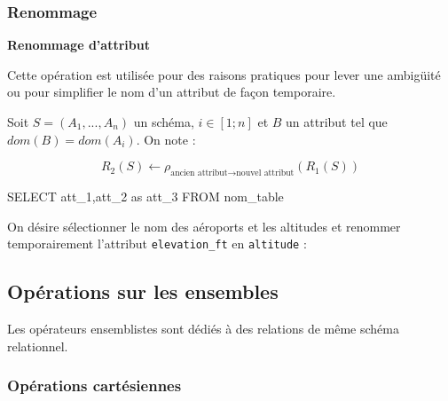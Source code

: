 \documentclass[10pt]{article}
\newif\ifprofvar
\begin{document}
\subsubsection{Renommage}
\begin{defi}
\textbf{Renommage d'attribut}

Cette opération est utilisée pour des raisons pratiques pour lever une ambigüité ou pour simplifier le nom d'un attribut de façon temporaire. 

Soit $S = (A_1,... ,A_n)$ un schéma, $ i \in[1;n]$ et $B$ un attribut tel que
$dom(B) = dom(A_i)$. On note :

$$
R_2 (S)\leftarrow \rho_{\text{ancien attribut} \rightarrow \text{nouvel attribut}}(R_1(S))
$$

\begin{envsql}
\begin{sql}
SELECT att_1,att_2 as att_3 FROM nom_table
\end{sql}
\end{envsql}

\end{defi}


\begin{exemple}
On désire sélectionner le nom des aéroports et les altitudes et  renommer temporairement l'attribut \texttt{elevation\_ft} en \texttt{altitude} :
\ifprofvar
$$
\pi_{\text{elevation\_ft}}\left(\rho_{\text{elevation\_ft} \rightarrow \text{altitude}}(\text{airports})\right)
$$
\begin{envsql}
\begin{sql}
SELECT name, elevation_ft AS altitude FROM airports;
\end{sql}
\end{envsql}
\else
\vspace{3cm}
\fi

\end{exemple}




\subsection{Opérations sur les ensembles}
\begin{rem}
Les opérateurs ensemblistes sont dédiés à des relations de même schéma relationnel. 
\end{rem}


\subsubsection{Opérations cartésiennes}
\end{document}
